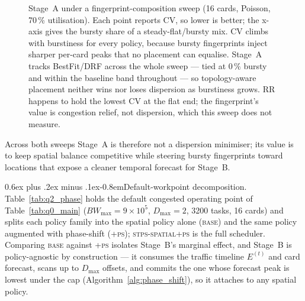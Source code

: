 \documentclass[letterpaper,twocolumn,10pt]{article}
\makeatletter
\newcommand{\tightparagraph}{\@startsection{paragraph}{4}{\z@}%
    {0.6ex plus .2ex minus .1ex}{-0.8em}{\normalfont\normalsize\bfseries}}
\makeatother
\begin{document}
\begin{figure}[t]
\centering
{}
\caption{Stage~A under a fingerprint-composition sweep (16 cards, Poisson, 70\,\% utilisation). Each point reports CV, so lower is better; the x-axis gives the bursty share of a steady-flat/bursty mix. CV climbs with burstiness for every policy, because bursty fingerprints inject sharper per-card peaks that no placement can equalise. Stage~A tracks BestFit/DRF across the whole sweep --- tied at $0\,\%$ bursty and within the baseline band throughout --- so topology-aware placement neither wins nor loses dispersion as burstiness grows. RR happens to hold the lowest CV at the flat end; the fingerprint's value is congestion relief, not dispersion, which this sweep does not measure.}
\label{fig:q1_mix}
\end{figure}

Across both sweeps Stage~A is therefore not a dispersion minimiser; its value is to keep spatial balance competitive while steering bursty fingerprints toward locations that expose a cleaner temporal forecast for Stage~B.

\tightparagraph{Default-workpoint decomposition.} Table~\ref{tab:q2_phase} holds the default congested operating point of Table~\ref{tab:q0_main} ($BW_{\max}\!=\!9\!\times\!10^{5}$, $D_{\max}\!=\!2$, 3200 tasks, 16 cards) and splits each policy family into the spatial policy alone (\textsc{base}) and the same policy augmented with phase-shift (\textsc{+ps}); \textsc{stps-spatial+ps} is the full scheduler. Comparing \textsc{base} against \textsc{+ps} isolates Stage~B's marginal effect, and Stage~B is policy-agnostic by construction --- it consumes the traffic timeline $E^{(t)}$ and card forecast, scans up to $D_{\max}$ offsets, and commits the one whose forecast peak is lowest under the cap (Algorithm~\ref{alg:phase_shift}), so it attaches to any spatial policy.
\end{document}
